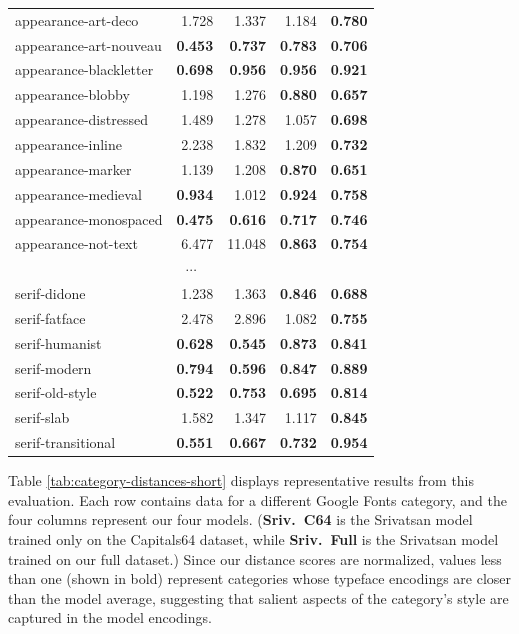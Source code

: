 \begin{longtable}{|l|r|r|r|r|}
appearance-art-deco       & 1.728          & 1.337          & 1.184          & \textbf{0.780} \\
appearance-art-nouveau    & \textbf{0.453} & \textbf{0.737} & \textbf{0.783} & \textbf{0.706} \\
appearance-blackletter    & \textbf{0.698} & \textbf{0.956} & \textbf{0.956} & \textbf{0.921} \\
appearance-blobby         & 1.198          & 1.276          & \textbf{0.880} & \textbf{0.657} \\
appearance-distressed     & 1.489          & 1.278          & 1.057          & \textbf{0.698} \\
appearance-inline     & 2.238          & 1.832          & 1.209          & \textbf{0.732} \\
appearance-marker     & 1.139          & 1.208          & \textbf{0.870}      & \textbf{0.651} \\
appearance-medieval     & \textbf{0.934}    & 1.012   & \textbf{0.924}          & \textbf{0.758} \\
appearance-monospaced     & \textbf{0.475}  & \textbf{0.616}  & \textbf{0.717}  & \textbf{0.746} \\
appearance-not-text     & 6.477          & 11.048       &  \textbf{0.863}   & \textbf{0.754} \\
\hline
\multicolumn{5}{|c|}{$\cdots$} \\
\hline
serif-didone             & 1.238          & 1.363          & \textbf{0.846}          & \textbf{0.688} \\
serif-fatface             & 2.478          & 2.896          & 1.082          & \textbf{0.755} \\
serif-humanist            & \textbf{0.628} & \textbf{0.545} & \textbf{0.873} & \textbf{0.841} \\
serif-modern              & \textbf{0.794} & \textbf{0.596} & \textbf{0.847} & \textbf{0.889} \\
serif-old-style           & \textbf{0.522} & \textbf{0.753} & \textbf{0.695} & \textbf{0.814} \\
serif-slab                & 1.582          & 1.347          & 1.117          & \textbf{0.845} \\
serif-transitional        & \textbf{0.551} & \textbf{0.667} & \textbf{0.732} & \textbf{0.954} \\

\end{longtable}

Table \ref{tab:category-distances-short} displays representative results from this evaluation. Each row contains data for a different Google Fonts category, and the four columns represent our four models. (\textbf{Sriv.\ C64} is the Srivatsan model trained only on the Capitals64 dataset, while \textbf{Sriv.\ Full} is the Srivatsan model trained on our full dataset.) Since our distance scores are normalized, values less than one (shown in bold) represent categories whose typeface encodings are closer than the model average, suggesting that salient aspects of the category's style are captured in the model encodings.

